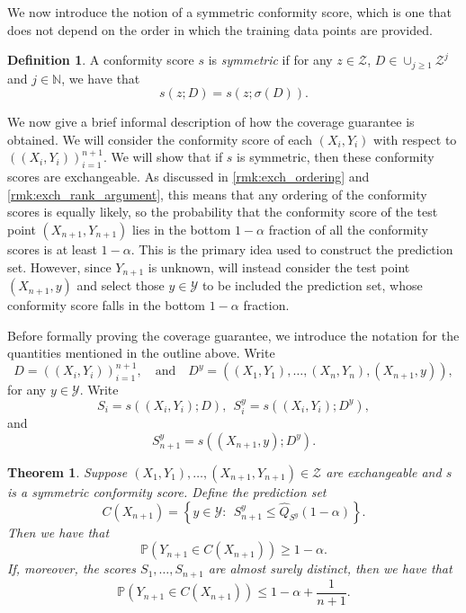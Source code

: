 \documentclass[11pt, titlepage]{article} %
\newcommand{\Prob}[1]{\mathbb{P}\left( #1 \right)}
\numberwithin{equation}{section}
\newtheorem{theorem}{Theorem}
\theoremstyle{definition}
\newtheorem{definition}{Definition}
\numberwithin{theorem}{section}
\numberwithin{lemma}{section}
\numberwithin{corollary}{section}
\numberwithin{proposition}{section}
\numberwithin{definition}{section}
\numberwithin{remark}{section}
\begin{document}
\noindent
We now introduce the notion of a symmetric conformity score, which is one that does not depend on the order in which the training data points are provided.

\begin{definition}
    A conformity score \(s\) is \textit{symmetric} if for any \(z \in \mathcal{Z}\), \(D \in \cup_{j \geq 1} \mathcal{Z}^j\) and \(j \in \mathbb{N}\), we have that \[s(z; D) = s(z; \sigma(D)).\]
\label{defn:symmetric_conformityscore}
\end{definition}

\noindent
We now give a brief informal description of how the coverage guarantee is obtained. We will consider the conformity score of each \((X_i, Y_i)\) with respect to \(((X_i, Y_i))_{i=1}^{n+1}\). We will show that if \(s\) is symmetric, then these conformity scores are exchangeable. As discussed in \cref{rmk:exch_ordering} and \cref{rmk:exch_rank_argument}, this means that any ordering of the conformity scores is equally likely, so the probability that the conformity score of the test point \((X_{n+1}, Y_{n+1})\) lies in the bottom \(1-\alpha\) fraction of all the conformity scores is at least \(1-\alpha\). This is the primary idea used to construct the prediction set. However, since \(Y_{n+1}\) is unknown, will instead consider the test point \((X_{n+1}, y)\) and select those \(y \in \mathcal{Y}\) to be included the prediction set, whose conformity score falls in the bottom \(1-\alpha\) fraction. \vskip5pt

\noindent
Before formally proving the coverage guarantee, we introduce the notation for the quantities mentioned in the outline above. Write \[D = ((X_i, Y_i))_{i=1}^{n+1}, \quad \text{and} \quad D^{y} = ((X_1, Y_1), \ldots, (X_n, Y_n), (X_{n+1}, y)), \] for any \(y \in \mathcal{Y}\).  Write \[S_i = s((X_i, Y_i); D), \ \ S_i^y = s((X_i, Y_i); D^y), \] and \[S_{n+1}^y = s((X_{n+1}, y); D^y).\]

\begin{theorem}
    Suppose \((X_1, Y_1), \ldots, (X_{n+1}, Y_{n+1}) \in \mathcal{Z}\) are exchangeable and \(s\) is a symmetric conformity score. Define the prediction set \begin{equation}
        C(X_{n+1}) = \left\{ y \in \mathcal{Y}: \ \ S_{n+1}^y \leq \hat{Q}_{S^y}(1-\alpha) \right\}.
    \label{eqn:fullconformal_prediction_set}
    \end{equation} Then we have that \[\Prob{Y_{n+1} \in C(X_{n+1})} \geq 1-\alpha.\] If, moreover, the scores \(S_1, \ldots, S_{n+1}\) are almost surely distinct, then we have that \[\Prob{Y_{n+1} \in C(X_{n+1})} \leq 1-\alpha + \frac{1}{n+1}.\]

\label{thm:fullconformal_coverage}  
\end{theorem}
\end{document}
